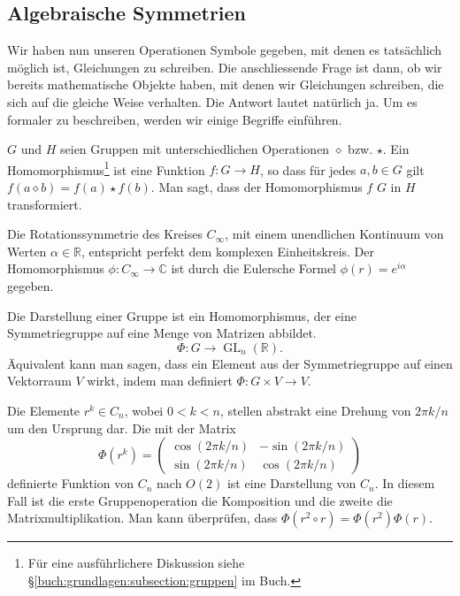 \subsection{Algebraische Symmetrien}
Wir haben nun unseren Operationen Symbole gegeben, mit denen es tatsächlich möglich ist, Gleichungen zu schreiben.
Die anschliessende Frage ist dann, ob wir bereits mathematische Objekte haben, mit denen wir Gleichungen schreiben, die sich auf die gleiche Weise verhalten.
Die Antwort lautet natürlich ja.
Um es formaler zu beschreiben, werden wir einige Begriffe einführen.
\begin{definition}[Gruppenhomomorphismus]
  \(G\) und \(H\) seien  Gruppen mit unterschiedlichen Operationen \(\diamond\) bzw.
  \(\star\).
  Ein Homomorphismus\footnote{ Für eine ausführlichere Diskussion siehe \S\ref{buch:grundlagen:subsection:gruppen} im Buch.} ist eine Funktion \(f: G \to H\), so dass für jedes \(a, b \in G\) gilt \(f(a\diamond b) = f(a) \star f(b)\).
  Man sagt, dass der Homomorphismus \(f\) \(G\) in \(H\) transformiert.
\end{definition}
\begin{beispiel}
  Die Rotationssymmetrie des Kreises \(C_\infty\), mit einem unendlichen Kontinuum von Werten \(\alpha \in \mathbb{R}\), entspricht perfekt dem komplexen Einheitskreis.
  Der Homomorphismus \(\phi: C_\infty \to \mathbb{C}\) ist durch die Eulersche Formel \(\phi(r) = e^{i\alpha}\) gegeben.
\end{beispiel}

\begin{definition}
  Die Darstellung einer Gruppe ist ein Homomorphismus, der eine Symmetriegruppe auf eine Menge von Matrizen abbildet.
  \[
    \Phi: G \to \operatorname{GL}_n(\mathbb{R}).
  \]
  Äquivalent kann man sagen, dass ein Element aus der Symmetriegruppe auf einen Vektorraum \(V\) wirkt, indem man definiert \(\Phi : G \times V \to V\).
\end{definition}
\begin{beispiel}
  Die Elemente \(r^k \in C_n\), wobei \(0 < k < n\), stellen abstrakt eine Drehung von \(2\pi k/n\) um den Ursprung dar.
  Die mit der Matrix 
  \[
    \Phi(r^k) = \begin{pmatrix}
      \cos(2\pi k/n) & -\sin(2\pi k/n) \\
      \sin(2\pi k/n) &  \cos(2\pi k/n)
    \end{pmatrix}
  \]
  definierte Funktion von \(C_n\) nach \(O(2)\) ist eine Darstellung von \(C_n\).
  In diesem Fall ist die erste Gruppenoperation die Komposition und die zweite die Matrixmultiplikation.
  Man kann überprüfen, dass \(\Phi(r^2 \circ r) = \Phi(r^2)\Phi(r)\).
\end{beispiel}

